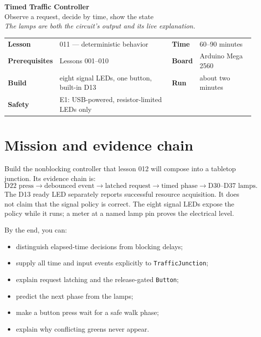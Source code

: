 \documentclass[11pt]{article}
\begin{document}
\begin{center}
  {\Huge\bfseries Timed Traffic Controller}\\[4pt]
  {\Large Observe a request, decide by time, show the state}\\[8pt]
  \textit{The lamps are both the circuit's output and its live explanation.}
\end{center}

\begin{tabularx}{\linewidth}{@{}>{\bfseries}l X >{\bfseries}l X@{}}
Lesson & 011 --- deterministic behavior & Time & 60--90 minutes\\
Prerequisites & Lessons 001--010 & Board & Arduino Mega 2560\\
Build & eight signal LEDs, one button, built-in D13 & Run & about two minutes\\
Safety & E1: USB-powered, resistor-limited LEDs only\\
\end{tabularx}

\section{Mission and evidence chain}

Build the nonblocking controller that lesson 012 will compose into a tabletop
junction. Its evidence chain is:
\[
\text{D22 press}\rightarrow
\text{debounced event}\rightarrow
\text{latched request}\rightarrow
\text{timed phase}\rightarrow
\text{D30--D37 lamps}.
\]
The D13 ready LED separately reports successful resource acquisition. It does
not claim that the signal policy is correct. The eight signal LEDs expose the
policy while it runs; a meter at a named lamp pin proves the electrical level.

By the end, you can:

\begin{itemize}
  \item distinguish elapsed-time decisions from blocking delays;
  \item supply all time and input events explicitly to \texttt{TrafficJunction};
  \item explain request latching and the release-gated \texttt{Button};
  \item predict the next phase from the lamps;
  \item make a button press wait for a safe walk phase;
  \item explain why conflicting greens never appear.
\end{itemize}
\end{document}
